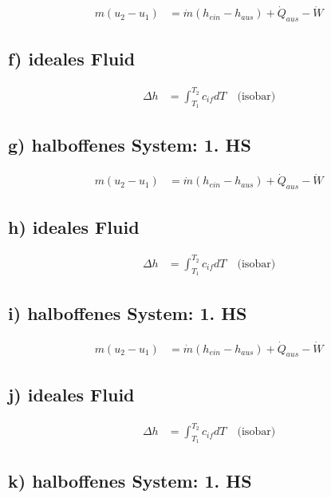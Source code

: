 \begin{align*}
    m(u_2 - u_1) &= \dot{m} (h_{ein} - h_{aus}) + \dot{Q}_{aus} - \dot{W}
\end{align*}

\subsection*{f) ideales Fluid}

\begin{align*}
    \Delta h &= \int_{T_1}^{T_2} c_{if} dT \quad \text{(isobar)}
\end{align*}

\subsection*{g) halboffenes System: 1. HS}

\begin{align*}
    m(u_2 - u_1) &= \dot{m} (h_{ein} - h_{aus}) + \dot{Q}_{aus} - \dot{W}
\end{align*}

\subsection*{h) ideales Fluid}

\begin{align*}
    \Delta h &= \int_{T_1}^{T_2} c_{if} dT \quad \text{(isobar)}
\end{align*}

\subsection*{i) halboffenes System: 1. HS}

\begin{align*}
    m(u_2 - u_1) &= \dot{m} (h_{ein} - h_{aus}) + \dot{Q}_{aus} - \dot{W}
\end{align*}

\subsection*{j) ideales Fluid}

\begin{align*}
    \Delta h &= \int_{T_1}^{T_2} c_{if} dT \quad \text{(isobar)}
\end{align*}

\subsection*{k) halboffenes System: 1. HS}

